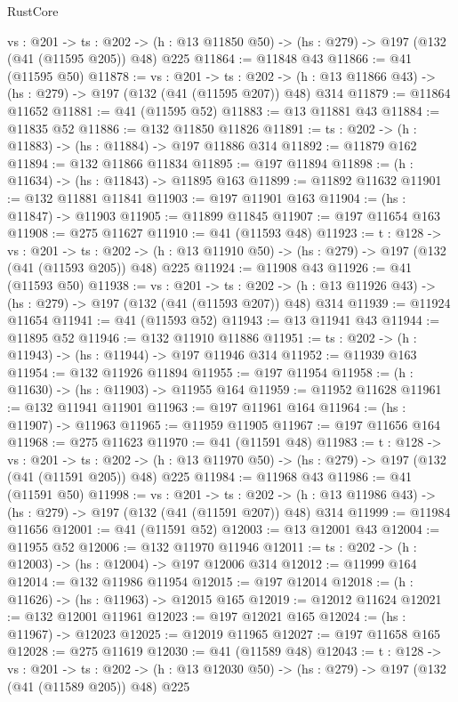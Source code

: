\begin{lexlean}{RustCore}
\begin{coremodule}
  {vs : @201} ->
  {ts : @202} -> (h : @13 @11850 @50) -> (hs : @279) -> @197 (@132 (@41 (@11595 @205)) @48) @225
@11864 := @11848 @43
@11866 := @41 (@11595 @50)
@11878 := {vs : @201} ->
  {ts : @202} -> (h : @13 @11866 @43) -> (hs : @279) -> @197 (@132 (@41 (@11595 @207)) @48) @314
@11879 := @11864 @11652
@11881 := @41 (@11595 @52)
@11883 := @13 @11881 @43
@11884 := @11835 @52
@11886 := @132 @11850 @11826
@11891 := {ts : @202} -> (h : @11883) -> (hs : @11884) -> @197 @11886 @314
@11892 := @11879 @162
@11894 := @132 @11866 @11834
@11895 := @197 @11894
@11898 := (h : @11634) -> (hs : @11843) -> @11895 @163
@11899 := @11892 @11632
@11901 := @132 @11881 @11841
@11903 := @197 @11901 @163
@11904 := (hs : @11847) -> @11903
@11905 := @11899 @11845
@11907 := @197 @11654 @163
@11908 := @275 @11627
@11910 := @41 (@11593 @48)
@11923 := {t : @128} ->
  {vs : @201} ->
  {ts : @202} -> (h : @13 @11910 @50) -> (hs : @279) -> @197 (@132 (@41 (@11593 @205)) @48) @225
@11924 := @11908 @43
@11926 := @41 (@11593 @50)
@11938 := {vs : @201} ->
  {ts : @202} -> (h : @13 @11926 @43) -> (hs : @279) -> @197 (@132 (@41 (@11593 @207)) @48) @314
@11939 := @11924 @11654
@11941 := @41 (@11593 @52)
@11943 := @13 @11941 @43
@11944 := @11895 @52
@11946 := @132 @11910 @11886
@11951 := {ts : @202} -> (h : @11943) -> (hs : @11944) -> @197 @11946 @314
@11952 := @11939 @163
@11954 := @132 @11926 @11894
@11955 := @197 @11954
@11958 := (h : @11630) -> (hs : @11903) -> @11955 @164
@11959 := @11952 @11628
@11961 := @132 @11941 @11901
@11963 := @197 @11961 @164
@11964 := (hs : @11907) -> @11963
@11965 := @11959 @11905
@11967 := @197 @11656 @164
@11968 := @275 @11623
@11970 := @41 (@11591 @48)
@11983 := {t : @128} ->
  {vs : @201} ->
  {ts : @202} -> (h : @13 @11970 @50) -> (hs : @279) -> @197 (@132 (@41 (@11591 @205)) @48) @225
@11984 := @11968 @43
@11986 := @41 (@11591 @50)
@11998 := {vs : @201} ->
  {ts : @202} -> (h : @13 @11986 @43) -> (hs : @279) -> @197 (@132 (@41 (@11591 @207)) @48) @314
@11999 := @11984 @11656
@12001 := @41 (@11591 @52)
@12003 := @13 @12001 @43
@12004 := @11955 @52
@12006 := @132 @11970 @11946
@12011 := {ts : @202} -> (h : @12003) -> (hs : @12004) -> @197 @12006 @314
@12012 := @11999 @164
@12014 := @132 @11986 @11954
@12015 := @197 @12014
@12018 := (h : @11626) -> (hs : @11963) -> @12015 @165
@12019 := @12012 @11624
@12021 := @132 @12001 @11961
@12023 := @197 @12021 @165
@12024 := (hs : @11967) -> @12023
@12025 := @12019 @11965
@12027 := @197 @11658 @165
@12028 := @275 @11619
@12030 := @41 (@11589 @48)
@12043 := {t : @128} ->
  {vs : @201} ->
  {ts : @202} -> (h : @13 @12030 @50) -> (hs : @279) -> @197 (@132 (@41 (@11589 @205)) @48) @225

\end{coremodule}
\end{lexlean}
